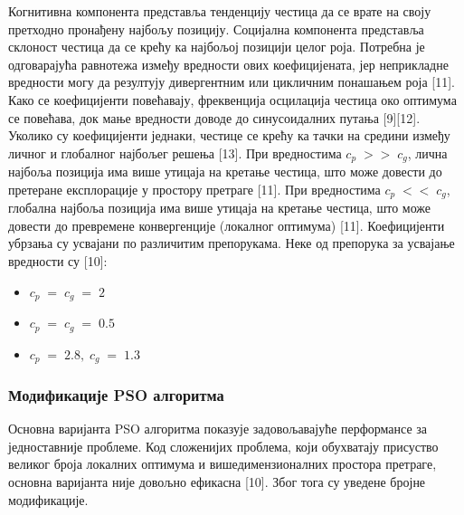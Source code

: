 \documentclass[12pt]{article}
\begin{document}
Когнитивна компонента представља тенденцију честица да се врате на своју претходно пронађену најбољу позицију. Социјална компонента представља склоност честица да се крећу ка најбољој позицији целог роја. 
Потребна је одговарајућа равнотежа између вредности ових коефицијената, јер неприкладне вредности могу да резултују дивергентним или цикличним понашањем роја [11]. Како се коефицијенти повећавају, фреквенција осцилација честица око оптимума се повећава, док мање вредности доводе до синусоидалних путања [9][12]. Уколико су коефицијенти једнаки, честице се крећу ка тачки на средини између личног и глобалног најбољег решења [13]. При вредностима $c_p\;>>\;c_g$, лична најбоља позиција има више утицаја на кретање честица, што може довести до претеране експлорације у простору претраге [11]. При вредностима $c_p\;<<\;c_g$, глобална најбоља позиција има више утицаја на кретање честица, што може довести до превремене конвергенције (локалног оптимума) [11]. Коефицијенти убрзања су усвајани по различитим препорукама. Неке од препорука за усвајање вредности су [10]: 
\begin{itemize}
    \item $c_p\;=\;c_g\;=\;2$
    \item $c_p\;=\;c_g\;=\;0.5$
    \item $c_p\;=\;2.8,\;c_g\;=\;1.3$
\end{itemize}
\subsubsection{Модификације PSO алгоритма}
Основна варијанта PSO алгоритма показује задовољавајуће перформансе за једноставније проблеме. Код сложенијих проблема, који обухватају присуство великог броја локалних оптимума и вишедимензионалних простора претраге, основна варијанта није довољно ефикасна [10]. Због тога су уведене бројне модификације.
\end{document}
